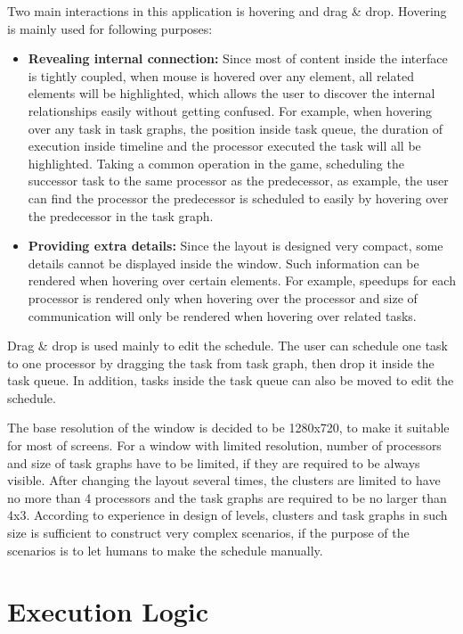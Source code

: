 \documentclass[msc,deptreport, cs]{infthesis}
\begin{document}
Two main interactions in this application is hovering and drag \& drop. Hovering is mainly used for following purposes:

\begin{itemize}
  \item \textbf{Revealing internal connection:} Since most of content inside the interface is tightly coupled, when mouse is hovered over any element, all related elements will be highlighted, which allows the user to discover the internal relationships easily without getting confused. For example, when hovering over any task in task graphs, the position inside task queue, the duration of execution inside timeline and the processor executed the task will all be highlighted. Taking a common operation in the game, scheduling the successor task to the same processor as the predecessor, as example, the user can find the processor the predecessor is scheduled to easily by hovering over the predecessor in the task graph.
  \item \textbf{Providing extra details:} Since the layout is designed very compact, some details cannot be displayed inside the window. Such information can be rendered when hovering over certain elements. For example, speedups for each processor is rendered only when hovering over the processor and size of communication will only be rendered when hovering over related tasks.
\end{itemize}

Drag \& drop is used mainly to edit the schedule. The user can schedule one task to one processor by dragging the task from task graph, then drop it inside the task queue. In addition, tasks inside the task queue can also be moved to edit the schedule.

The base resolution of the window is decided to be 1280x720, to make it suitable for most of screens. For a window with limited resolution, number of processors and size of task graphs have to be limited, if they are required to be always visible. After changing the layout several times, the clusters are limited to have no more than 4 processors and the task graphs are required to be no larger than 4x3. According to experience in design of levels, clusters and task graphs in such size is sufficient to construct very complex scenarios, if the purpose of the scenarios is to let humans to make the schedule manually.

\section{Execution Logic} \label{sec:execution}
\end{document}
